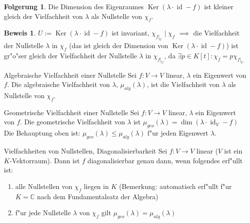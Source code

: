 \documentclass[oneside,fontsize=11pt,paper=a4,BCOR=0mm,DIV=12,automark,headsepline]{scrbook}
\DeclareMathOperator{\mKer}{Ker}
\DeclareMathOperator{\mId}{id}
\theoremstyle{remark}
\theoremstyle{definition}
\newtheorem{folgerung}{Folgerung}
\theoremstyle{definition}
\newtheorem*{prof}{Beweis}
\theoremstyle{remark}
\begin{document}
\begin{folgerung}
  Die Dimension des Eigenraumes \(\mKer(\lambda\cdot\mId - f)\) ist kleiner gleich der Vielfachheit von \(\lambda\) als Nullstelle von \(\chi_f\).
\end{folgerung}

\begin{prof}
  \(U:= \mKer(\lambda\cdot\mId - f)\) ist invariant,
  \(\chi_{f|_U} \mid \chi_f\) \(\implies\) die Vielfachheit der Nullstelle \(\lambda\) in \(\chi_f\) (das ist gleich der Dimension von \(\mKer(\lambda\cdot\mId - f)\)) ist gr"o"ser gleich der Vielfachheit der Nullstelle \(\lambda\) in \(\chi_{f|_U}\), da \(\exists p\in K[t]: \chi_f = p\chi_{f|_U}\)
\end{prof}

\begin{definition}{Algebraische Vielfachheit einer Nullstelle}{}
  Sei \(f: V\to V\) linear, $\lambda$ ein Eigenwert von $f$. Die algebraische Vielfachheit von \(\lambda\), \(\mu_{alg}(\lambda)\), ist die Vielfachheit von \(\lambda\) als Nullstelle von \(\chi_f\).
\end{definition}

\begin{definition}{Geometrische Vielfachheit einer Nullstelle}{}
  Sei \(f:V \to V\) linear, $\lambda$ ein Eigenwert von $f$. Die geometrische Vielfachheit von \(\lambda\) ist \(\mu_{geo}(\lambda) = \dim(\lambda\cdot\mId_V - f)\)
  Die Behauptung oben ist: \(\mu_{geo}(\lambda) \leq \mu_{alg}(\lambda)\) f"ur jeden Eigenwert \(\lambda\).
\end{definition}

\begin{satz}{Vielfachheiten von Nullstellen, Diagonalisierbarkeit}{}
  Sei \(f: V\to V\) linear (\(V\) ist ein \(K\)-Vektorraum). Dann ist \(f\) diagonalisierbar genau dann, wenn folgendes erf"ullt ist:
  \begin{enumerate}
  \item alle Nullstellen von \(\chi_f\) liegen in \(K\) (Bemerkung: automatisch erf"ullt f"ur \(K = \mathbb{C}\) nach dem Fundamentalsatz der Algebra)
  \item f"ur jede Nullstelle \(\lambda\) von \(\chi_f\) gilt \(\mu_{geo}(\lambda) = \mu_{alg}(\lambda)\)
  \end{enumerate}
\end{satz}
\end{document}
